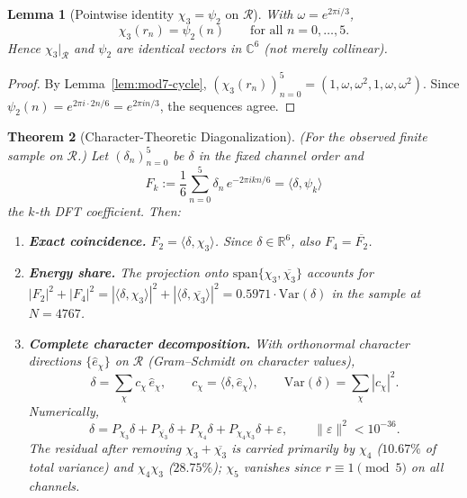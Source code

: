 \documentclass[11pt,a4paper]{article}
\newtheorem{theorem}{Theorem}
\newtheorem{lemma}[theorem]{Lemma}
\newcommand{\R}{\mathcal{R}}
\newcommand{\Var}{\mathrm{Var}}
\begin{document}
\begin{lemma}[Pointwise identity $\chi_3=\psi_2$ on $\R$]
\label{lem:chi3-equals-psi2}
With $\omega=e^{2\pi i/3}$,
\[
  \chi_3(r_n) = \psi_2(n)
  \qquad\text{for all } n=0,\ldots,5.
\]
Hence $\chi_3|_{\R}$ and $\psi_2$ are \emph{identical} vectors in
$\mathbb{C}^6$ (not merely collinear).
\end{lemma}

\begin{proof}
By Lemma~\ref{lem:mod7-cycle},
$(\chi_3(r_n))_{n=0}^{5}=(1,\omega,\omega^2,1,\omega,\omega^2)$.
Since $\psi_2(n)=e^{2\pi i\cdot 2n/6}=e^{2\pi i n/3}$, the sequences agree.
\end{proof}

\begin{theorem}[Character-Theoretic Diagonalization]
\label{thm:character-diagonalization}
\emph{(For the observed finite sample on $\R$.)}
Let $(\delta_n)_{n=0}^{5}$ be $\delta$ in the fixed channel order and
\[
  F_k := \frac{1}{6}\sum_{n=0}^{5} \delta_n\, e^{-2\pi i kn/6}
  = \langle\delta,\psi_k\rangle
\]
the $k$-th DFT coefficient. Then:
\begin{enumerate}
  \item \textbf{Exact coincidence.}
        $F_2 = \langle\delta,\chi_3\rangle$.
        Since $\delta\in\mathbb{R}^6$, also $F_4=\overline{F_2}$.
  \item \textbf{Energy share.}
        The projection onto $\mathrm{span}\{\chi_3,\overline{\chi_3}\}$
        accounts for
        $|F_2|^2+|F_4|^2
        = |\langle\delta,\chi_3\rangle|^2
        + |\langle\delta,\overline{\chi_3}\rangle|^2
        = 0.5971\cdot\Var(\delta)$
        in the sample at $N=4767$.
  \item \textbf{Complete character decomposition.}
        With orthonormal character directions $\{\hat{e}_\chi\}$ on $\R$
        (Gram--Schmidt on character values),
        \[
          \delta = \sum_\chi c_\chi\,\hat{e}_\chi,
          \qquad c_\chi=\langle\delta,\hat{e}_\chi\rangle,
          \qquad \Var(\delta)=\sum_\chi|c_\chi|^2.
        \]
        Numerically,
        \[
          \delta = P_{\chi_3}\delta + P_{\overline{\chi_3}}\delta
                   + P_{\chi_4}\delta + P_{\chi_4\chi_3}\delta + \varepsilon,
          \qquad \|\varepsilon\|^2 < 10^{-36}.
        \]
        The residual after removing $\chi_3+\overline{\chi_3}$ is carried
        primarily by $\chi_4$ ($10.67\%$ of total variance) and
        $\chi_4\chi_3$ ($28.75\%$); $\chi_5$ vanishes since $r\equiv 1\pmod 5$
        on all channels.
\end{enumerate}
\end{theorem}
\end{document}

